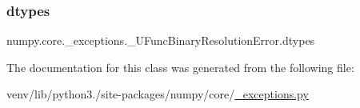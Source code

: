 \subsubsection{\texorpdfstring{dtypes}{dtypes}}
{\footnotesize\ttfamily numpy.\+core.\+\_\+exceptions.\+\_\+\+U\+Func\+Binary\+Resolution\+Error.\+dtypes}



The documentation for this class was generated from the following file\+:\begin{DoxyCompactItemize}
\item 
venv/lib/python3./site-\/packages/numpy/core/\hyperlink{__exceptions_8py}{\+\_\+exceptions.\+py}\end{DoxyCompactItemize}
